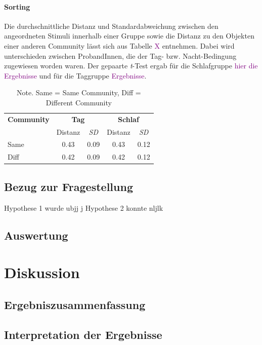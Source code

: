 \documentclass[preprint,12pt]{elsarticle}
\begin{document}
\paragraph{Sorting}
Die durchschnittliche Distanz und Standardabweichung zwischen den angeordneten Stimuli innerhalb einer Gruppe sowie die Distanz zu den Objekten einer anderen Community lässt sich aus Tabelle \textcolor{purple}{X} entnehmen. Dabei wird unterschieden zwischen ProbandInnen, die der Tag- bzw. Nacht-Bedingung zugewiesen worden waren. Der gepaarte \textit{t}-Test ergab für die Schlafgruppe \textcolor{purple}{hier die Ergebnisse} und für die Taggruppe \textcolor{purple}{Ergebnisse}.

\begin{table}[h]
\centering
\captionsetup{justification=centering, margin = 1cm}
\begin{tabular}{l c c c c} %
\hline
\textbf{Community} & \multicolumn{2}{c}{\textbf{Tag}} &  \multicolumn{2}{c}{\textbf{Schlaf}}\\
& Distanz & \textit{SD} & Distanz & \textit{SD} \\
\hline
Same & 0.43 & 0.09 & 0.43 & 0.12\\
Diff & 0.42 & 0.09 & 0.42 & 0.12\\
\hline
\end{tabular}
\caption{Note. Same = Same Community, Diff = Different Community}
\end{table}


\subsection{Bezug zur Fragestellung}
Hypothese 1 wurde ubjj j
Hypothese 2 konnte nljlk

\subsection{Auswertung}

\section{Diskussion}
\label{S:4}
\subsection{Ergebniszusammenfassung}


\subsection{Interpretation der Ergebnisse}
\end{document}
